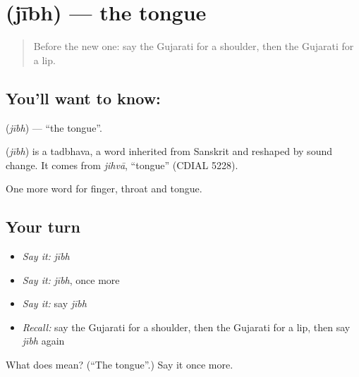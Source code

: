 \section[\texorpdfstring{\gu{જીભ} (jībh)}{જીભ (jībh)}]{ (jībh) — the tongue}

\label{lesson:GU-C47-tongue}



\begin{quote}
Before the new one: say the Gujarati for a shoulder, then the Gujarati for a lip.
\end{quote}

\subsection*{You'll want to know: }
\textbf{} (\emph{jībh}) — \textquotedblleft{}the tongue\textquotedblright{}.

\begin{cousinweb}
\textbf{} (\emph{jībh}) is a tadbhava, a word inherited from Sanskrit and reshaped by sound change. It comes from \emph{jihvā}, \textquotedblleft{}tongue\textquotedblright{} (CDIAL 5228).
\end{cousinweb}

\begin{grammarlens}[title={What you've built}]
One more word for finger, throat and tongue.
\end{grammarlens}

\subsection*{Your turn}
\begin{itemize}
\raggedright
  \item \emph{Say it:} \emph{jībh}
  \item \emph{Say it:} \emph{jībh}, once more
  \item \emph{Say it:} say \emph{jībh}
  \item \emph{Recall:} say the Gujarati for a shoulder, then the Gujarati for a lip, then say \emph{jībh} again
\end{itemize}

\begin{tcolorbox}[breakable,colback=teal!4,colframe=teal!35!black,title={Before you move on}]
What does  mean? (\textquotedblleft{}The tongue\textquotedblright{}.) Say it once more.
\end{tcolorbox}
